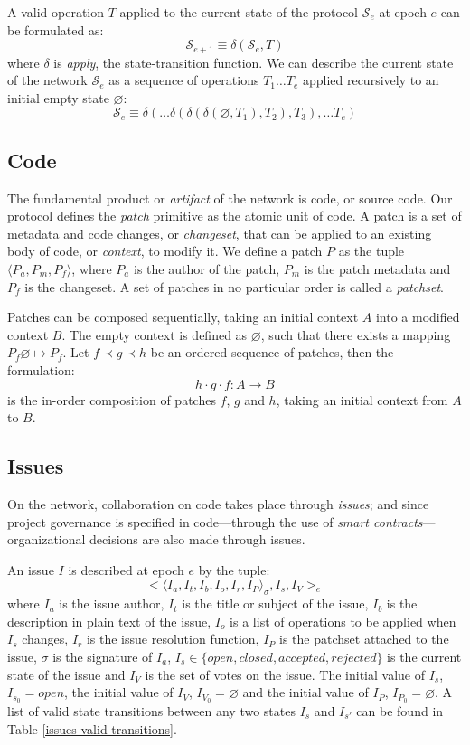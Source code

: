 A valid operation $T$ applied to the current state of
the protocol $\mathcal{S}_e$ at epoch $e$ can be formulated as:
\[
    \mathcal{S}_{e+1} \equiv \delta(\mathcal{S}_e, T)
\]
where $\delta$ is \emph{apply}, the state-transition function.  We can
describe the current state of the network $\mathcal{S}_e$ as a sequence of
operations ${T_1 \dots T_e}$ applied recursively to an initial empty state
$\varnothing$:
\[
    \mathcal{S}_e \equiv \delta(\dots \delta(\delta(\delta(\varnothing,
    T_1), T_2), T_3), \dots T_e)
\]

\subsection{Code} The fundamental product or \emph{artifact} of the \oscoin{}
network is code, or source code. Our protocol defines the \emph{patch}
primitive as the atomic unit of code. A patch is a set of metadata and code
changes, or \emph{changeset}, that can be applied to an existing body of code,
or \emph{context}, to modify it. We define a patch $P$ as the tuple $\langle
P_a, P_m, P_f \rangle$, where $P_a$ is the author of the patch, $P_m$ is the
patch metadata and $P_f$ is the changeset. A set of patches in no particular
order is called a \emph{patchset}.

Patches can be composed sequentially, taking an initial context $A$ into
a modified context $B$. The empty context is defined as $\varnothing$, such
that there exists a mapping $P_f \varnothing \mapsto P_f$. Let $f \prec g
\prec h$ be an ordered sequence of patches, then the formulation:
\[
h \cdot g \cdot f : A \to B
\]
is the in-order composition of patches $f$, $g$ and $h$, taking an initial
context from $A$ to $B$.


\subsection{Issues}

On the \oscoin{} network, collaboration on code takes place through \emph{issues};
and since project governance is specified in code---through the use of
\emph{smart contracts}---organizational decisions are also made through issues.


An issue $I$ is described at epoch $e$ by the tuple:
\[
    \big<\langle I_a, I_t, I_b, I_o, I_r, I_P \rangle_{\sigma}, I_s, I_V \big>_e
\]
where $I_a$ is the issue author, $I_t$ is the title or subject of the issue,
$I_b$ is the description in plain text of the issue, $I_o$ is a list of
operations to be applied when $I_s$ changes, $I_r$ is the issue resolution
function, $I_P$ is the patchset attached to the issue, $\sigma$ is the
signature of $I_a$, $I_s \in \{open, closed, accepted, rejected\}$ is the
current state of the issue and $I_V$ is the set of votes on the issue. The
initial value of $I_s$, $I_{s_0} = open$, the initial value of $I_V$, $I_{V_0}
= \varnothing$ and the initial value of $I_P$, $I_{P_0} = \varnothing$.  A list
of valid state transitions between any two states $I_s$ and $I_{s'}$ can be
found in Table \ref{issues-valid-transitions}.

